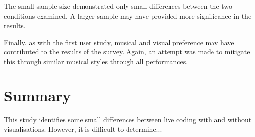The small sample size demonstrated only small differences between the two conditions examined. A larger sample may have provided more significance in the results.

Finally, as with the first user study, musical and visual preference may have contributed to the results of the survey. Again, an attempt was made to mitigate this through similar musical styles through all performances.

\section{Summary}

\more

This study identifies some small differences between live coding with and without visualisations. However, it is difficult to determine...









